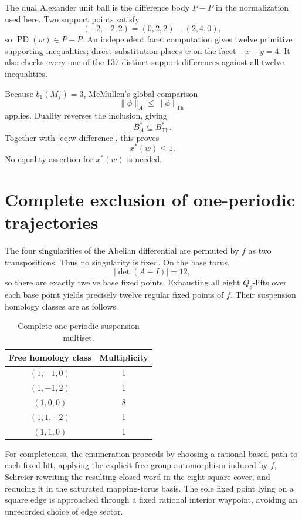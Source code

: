 \documentclass[10pt,reqno]{amsart}
\theoremstyle{definition}
\newcommand{\PD}{\operatorname{PD}}
\begin{document}
The dual Alexander unit ball is the difference body \(P-P\) in the
normalization used here.  Two support points satisfy
\begin{equation}\label{eq:w-difference}
 (-2,-2,2)=(0,2,2)-(2,4,0),
\end{equation}
so \(\PD(w)\in P-P\).  An independent facet computation gives twelve
primitive supporting inequalities; direct substitution places \(w\) on the
facet \(-x-y=4\).  It also checks every one of the 137 distinct support
differences against all twelve inequalities.

Because \(b_1(M_f)=3\), McMullen's global comparison
\[
 \|\phi\|_A\leq\|\phi\|_{\mathrm{Th}}
\]
applies.  Duality reverses the inclusion, giving
\[
 B_A^*\subseteq B_{\mathrm{Th}}^*.
\]
Together with \eqref{eq:w-difference}, this proves
\begin{equation}\label{eq:dual-thurston}
 x^*(w)\leq1.
\end{equation}
No equality assertion for \(x^*(w)\) is needed.

\section{Complete exclusion of one-periodic trajectories}

The four singularities of the Abelian differential are permuted by \(f\) as
two transpositions.  Thus no singularity is fixed.  On the base torus,
\[
 |\det(A-I)|=12,
\]
so there are exactly twelve base fixed points.  Exhausting all eight
\(Q_8\)-lifts over each base point yields precisely twelve regular fixed
points of \(f\).  Their suspension homology classes are as follows.

\begin{table}[ht]
\centering
\caption{Complete one-periodic suspension multiset.}
\label{tab:periodic}
\begin{tabular}{cc}
\toprule
Free homology class & Multiplicity\\
\midrule
\((1,-1,0)\) & 1\\
\((1,-1,2)\) & 1\\
\((1,0,0)\) & 8\\
\((1,1,-2)\) & 1\\
\((1,1,0)\) & 1\\
\bottomrule
\end{tabular}
\end{table}

For completeness, the enumeration proceeds by choosing a rational based path
to each fixed lift, applying the explicit free-group automorphism induced by
\(f\), Schreier-rewriting the resulting closed word in the eight-square
cover, and reducing it in the saturated mapping-torus basis.  The sole fixed
point lying on a square edge is approached through a fixed rational interior
waypoint, avoiding an unrecorded choice of edge sector.
\end{document}

